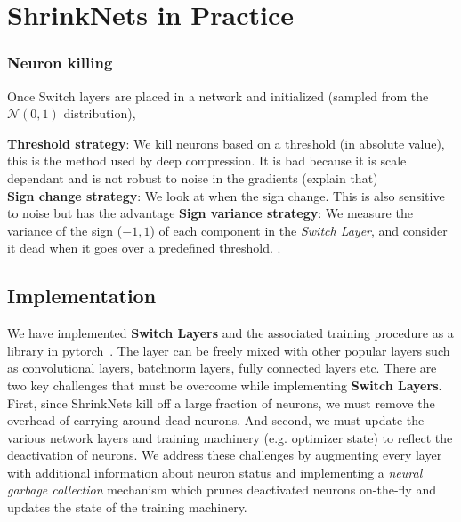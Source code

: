 \section{ShrinkNets in Practice}

\subsubsection{Neuron killing}
Once Switch layers are placed in a network and
initialized (sampled from the $\mathcal{N}(0, 1)$ distribution),

\textbf{Threshold strategy}:  We kill neurons based on a threshold (in absolute
value), this is the method used by deep compression. It is bad because it is
scale dependant and is not robust to noise in the gradients (explain that)
\\ \textbf{Sign change strategy}:  We look at when the sign change. This is also
sensitive to noise but has the advantage
\textbf{Sign variance strategy}: We measure the variance of the sign ($-1, 1$) of each component in the \textit{Switch Layer}, and consider it dead when it goes over a predefined threshold. . 

\subsection{Implementation}

We have implemented \textbf{Switch Layers} and the associated training procedure
as a library in pytorch~\cite{github}.
The layer can be freely mixed with other popular layers such as convolutional
layers, batchnorm layers, fully connected layers etc.
There are two key challenges that must be overcome while implementing 
\textbf{Switch Layers}.
First, since ShrinkNets kill off a large fraction of neurons, we must remove the
overhead of carrying around dead neurons.
And second, we must update the various network layers and training machinery (e.g.
optimizer state) to reflect the deactivation of neurons.
We address these challenges by augmenting every layer with additional information
about neuron status and implementing a \emph{neural garbage collection} 
mechanism which prunes deactivated neurons on-the-fly and updates the state of 
the training machinery.

